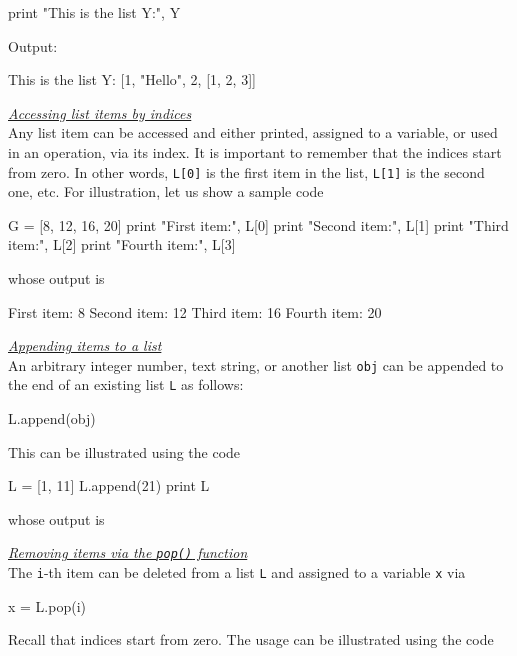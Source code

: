 \begin{bluecode}
print "This is the list Y:", Y
\end{bluecode}
Output:

\begin{greencode}
This is the list Y: [1, "Hello", 2, [1, 2, 3]]
\end{greencode}
\underline{\em Accessing list items by indices}\\

Any list item can be accessed and either printed, assigned 
to a variable, or used in an operation, via its index. It is important to remember that 
the indices start from zero. In other words, {\tt L[0]} is the 
first item in the list, {\tt L[1]} is the second one, etc. For
illustration, let us show a sample code

\begin{bluecode}
G = [8, 12, 16, 20]
print "First item:", L[0]
print "Second item:", L[1]
print "Third item:", L[2]
print "Fourth item:", L[3]
\end{bluecode}
whose output is

\begin{greencode}
First item: 8
Second item: 12
Third item: 16
Fourth item: 20
\end{greencode}
\underline{\em Appending items to a list}\\

An arbitrary integer number, text string, or another list {\tt obj} can be appended 
to the end of an existing list {\tt L} as follows:

\begin{bluecode}
L.append(obj)
\end{bluecode}
This can be illustrated using the code

\begin{bluecode}
L = [1, 11]
L.append(21)
print L
\end{bluecode}
whose output is 

\begin{greencode}
[1, 11, 21]
\end{greencode}
\underline{\em Removing items via the {\tt pop()} function}\\

The {\tt i}-th item can be deleted from a list {\tt L} 
and assigned to a variable {\tt x} via 

\begin{bluecode}
x = L.pop(i)
\end{bluecode}
Recall that indices start from zero. The usage can be illustrated using the code

